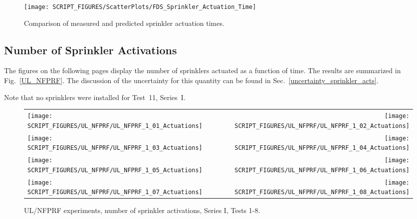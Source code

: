 \begin{figure}[h]
\begin{center}
\texttt{[image: SCRIPT\_FIGURES/ScatterPlots/FDS\_Sprinkler\_Actuation\_Time]}
\end{center}
\caption[Comparison of measured and predicted sprinkler actuation times]{Comparison of measured and predicted sprinkler actuation times.}
\label{Sprinkler_Activation_Times}
\end{figure}


\clearpage

\subsection{Number of Sprinkler Activations}
\label{UL_NFPRF:Results}
\label{Sprinkler Actuations}

The figures on the following pages display the number of sprinklers actuated as a function of time. The results are summarized in Fig.~\ref{UL_NFPRF}. The discussion of the uncertainty for this quantity can be found in Sec.~\ref{uncertainty_sprinkler_acts}.

Note that no sprinklers were installed for Test~11, Series~I.

\newpage

\begin{figure}[p]
\begin{tabular*}{\textwidth}{l@{\extracolsep{\fill}}r}
\texttt{[image: SCRIPT\_FIGURES/UL\_NFPRF/UL\_NFPRF\_1\_01\_Actuations]} &
\texttt{[image: SCRIPT\_FIGURES/UL\_NFPRF/UL\_NFPRF\_1\_02\_Actuations]} \\
\texttt{[image: SCRIPT\_FIGURES/UL\_NFPRF/UL\_NFPRF\_1\_03\_Actuations]} &
\texttt{[image: SCRIPT\_FIGURES/UL\_NFPRF/UL\_NFPRF\_1\_04\_Actuations]} \\
\texttt{[image: SCRIPT\_FIGURES/UL\_NFPRF/UL\_NFPRF\_1\_05\_Actuations]} &
\texttt{[image: SCRIPT\_FIGURES/UL\_NFPRF/UL\_NFPRF\_1\_06\_Actuations]} \\
\texttt{[image: SCRIPT\_FIGURES/UL\_NFPRF/UL\_NFPRF\_1\_07\_Actuations]} &
\texttt{[image: SCRIPT\_FIGURES/UL\_NFPRF/UL\_NFPRF\_1\_08\_Actuations]} \\
\end{tabular*}
\caption[UL/NFPRF experiments, number of sprinkler activations, Series I, Tests 1-8]{UL/NFPRF experiments, number of sprinkler activations, Series I, Tests 1-8.}
\label{UL_NFPRF_1}
\end{figure}

